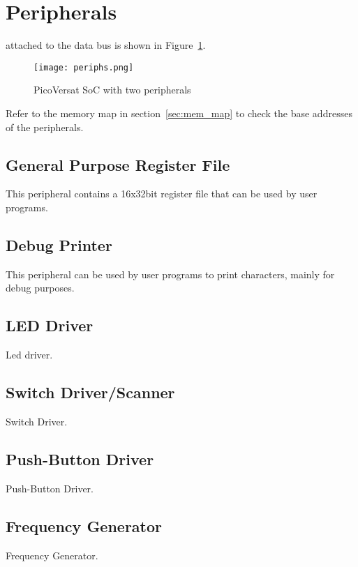\section{Peripherals}
\label{sec:periphs}

attached to the data bus is shown in Figure~\ref{fig:periphs}.

\begin{figure}[!htbp]
    \centerline{\texttt{[image: periphs.png]}}
    \vspace{0cm}\caption{PicoVersat SoC with two peripherals}
    \label{fig:periphs}
\end{figure}

Refer to the memory map in section~\ref{sec:mem_map} to check the base addresses
of the peripherals.

\subsection{General Purpose Register File}

This peripheral contains a 16x32bit register file that can be used by user
programs. 

\subsection{Debug Printer}

This peripheral can be used by user programs to print characters, mainly for
debug purposes.

\subsection{LED Driver}

Led driver.

\subsection{Switch Driver/Scanner}

Switch Driver.

\subsection{Push-Button Driver}

Push-Button Driver.

\subsection{Frequency Generator}

Frequency Generator.

